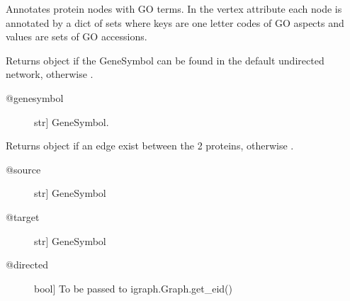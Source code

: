 \documentclass[letterpaper,10pt,english]{sphinxmanual}
\begin{document}
\begin{fulllineitems}

\begin{fulllineitems}
\label{\detokenize{main:pypath.main.PyPath.go_annotate}}
Annotates protein nodes with GO terms. In the  vertex
attribute each node is annotated by a dict of sets where keys are
one letter codes of GO aspects and values are sets of GO accessions.

\end{fulllineitems}


\begin{fulllineitems}
\label{\detokenize{main:pypath.main.PyPath.gs}}
Returns  object if the GeneSymbol
can be found in the default undirected network,
otherwise .
\begin{description}
\item[{@genesymbol}] \leavevmode{[}str{]}
GeneSymbol.

\end{description}

\end{fulllineitems}


\begin{fulllineitems}
\label{\detokenize{main:pypath.main.PyPath.gs_edge}}
Returns  object if an edge exist between
the 2 proteins, otherwise .
\begin{description}
\item[{@source}] \leavevmode{[}str{]}
GeneSymbol

\item[{@target}] \leavevmode{[}str{]}
GeneSymbol

\item[{@directed}] \leavevmode{[}bool{]}
To be passed to igraph.Graph.get\_eid()

\end{description}


\end{fulllineitems}
\end{fulllineitems}
\end{document}

